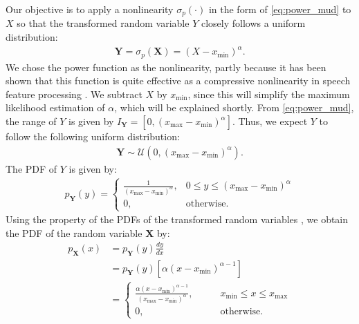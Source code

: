 \documentclass[a4paper]{article}
\begin{document}
Our objective is to apply a nonlinearity $\sigma_{p}(\cdot)$ 
in the form of \eqref{eq:power_mud} to $X$  so that the transformed
random variable $Y$ closely follows a uniform distribution:
\begin{align}
  \mathbf{Y} = \sigma_{p} \left(\mathbf{X} \right) = (X - x_{\text{min}})^{\alpha}.
    \label{eq:power_mud}
\end{align}
We chose the power function as the nonlinearity, partly because
it has been shown that this function is quite effective as
a compressive nonlinearity in speech feature processing 
\cite{C_Kim_IEEETran_2016_1,C_Kim_ICASSP_2012_1,
C_Kim_ICASSP_2010_1, C_Kim_INTERSPEECH_2009_2}.
We subtract $X$ by $x_{\text{min}}$, since this will simplify
the maximum likelihood estimation of $\alpha$, which will be
explained shortly.
From \eqref{eq:power_mud}, the range of $Y$ is given by
$I_{\mathbf{Y}} = \left[0, \left(x_{\text{max}} - x_{\text{min}} \right)
    ^{\alpha}\right]$. 
Thus, we expect $Y$ to follow the following uniform distribution:
\begin{align}
  \mathbf{Y} \sim 
  \mathcal{U}(0, \left(x_{\text{max}} - x_{\text{min}} \right)^{\alpha} ).
    \label{eq:pdf_y}
\end{align}
The PDF of $Y$ is given by:
%
\begin{align}
  p_{\mathbf{Y}}(y) =             
    \begin{cases}
      \frac{1}{\left(x_{\text{max}} - x_{\text{min}} \right)^{\alpha}} ,
          & 0 \le y \le \left(x_{\text{max}} - x_{\text{min}} \right)^{\alpha}   \\
      0, \qquad                    & \text{otherwise}.
    \end{cases}
\end{align}
%
Using the property of the PDFs of the transformed random variables
\cite{A_Papoulis_McGrawHill_2002},
we obtain the PDF of the random variable $\mathbf{X}$ by:
%
%
\begin{align}
  p_{\mathbf{X}}(x)
                & = p_{\mathbf{Y}}(y) \frac{dy}{dx}   \nonumber \\
                & = p_{\mathbf{Y}}(y) \left[ \alpha 
                    \left(x - x_{\text{min}}\right)^{\alpha-1} \right]
                    \nonumber \\
                & = 
                \begin{cases}
                  \frac{\alpha \left(x - x_{\text{min}}\right)  ^{\alpha-1}}
                    {\left(x_{\text{max}} - x_{\text{min}}\right)^{\alpha}},  
                      \qquad &  x_{\text{min}} \le x \le x_{\text{max}} \\ 
                  0,         &\text{otherwise}.
                \end{cases}
  \label{eq:pdf_x}
\end{align}
\end{document}
